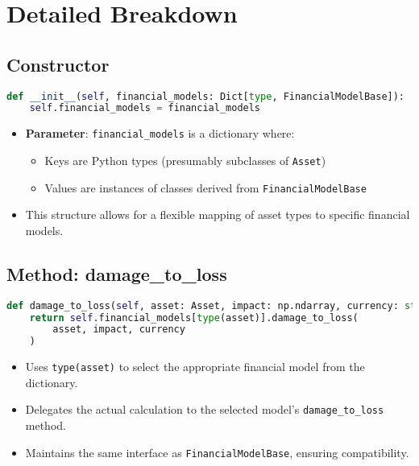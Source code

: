 \documentclass{article}
\begin{document}
\section{Detailed Breakdown}

\subsection{Constructor}

\begin{lstlisting}[language=Python]
def __init__(self, financial_models: Dict[type, FinancialModelBase]):
    self.financial_models = financial_models
\end{lstlisting}

\begin{itemize}
    \item \textbf{Parameter}: \texttt{financial\_models} is a dictionary where:
    \begin{itemize}
        \item Keys are Python types (presumably subclasses of \texttt{Asset})
        \item Values are instances of classes derived from \texttt{FinancialModelBase}
    \end{itemize}
    \item This structure allows for a flexible mapping of asset types to specific financial models.
\end{itemize}

\subsection{Method: damage\_to\_loss}

\begin{lstlisting}[language=Python]
def damage_to_loss(self, asset: Asset, impact: np.ndarray, currency: str):
    return self.financial_models[type(asset)].damage_to_loss(
        asset, impact, currency
    )
\end{lstlisting}

\begin{itemize}
    \item Uses \texttt{type(asset)} to select the appropriate financial model from the dictionary.
    \item Delegates the actual calculation to the selected model's \texttt{damage\_to\_loss} method.
    \item Maintains the same interface as \texttt{FinancialModelBase}, ensuring compatibility.
\end{itemize}
\end{document}
